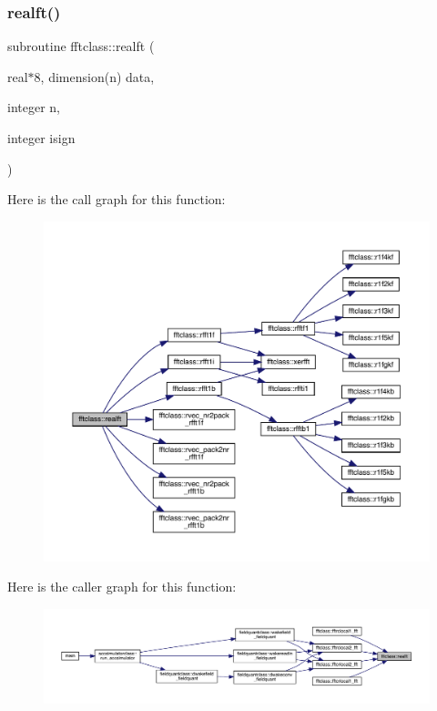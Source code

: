 \subsubsection{\texorpdfstring{realft()}{realft()}}
{\footnotesize\ttfamily subroutine fftclass\+::realft (\begin{DoxyParamCaption}\item[{real$\ast$8, dimension(n)}]{data,  }\item[{integer}]{n,  }\item[{integer}]{isign }\end{DoxyParamCaption})}

Here is the call graph for this function\+:\nopagebreak
\begin{figure}[H]
\begin{center}
\leavevmode
\includegraphics[width=350pt]{namespacefftclass_a1aec6e8023ec23ff926a64c54c93ee1e_cgraph}
\end{center}
\end{figure}
Here is the caller graph for this function\+:\nopagebreak
\begin{figure}[H]
\begin{center}
\leavevmode
\includegraphics[width=350pt]{namespacefftclass_a1aec6e8023ec23ff926a64c54c93ee1e_icgraph}
\end{center}
\end{figure}
\mbox{\label{namespacefftclass_a2bdd31e65a4abb79ed9e0eeaa71cee6b}} 

